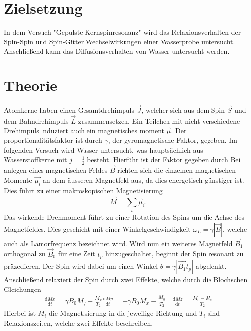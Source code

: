 \section{Zielsetzung}
In dem Versuch "Gepulste Kernspinresonanz" wird das Relaxionsverhalten der Spin-Spin und Spin-Gitter Wechselwirkungen einer Wasserprobe untersucht.
Anschließend kann das Diffusionsverhalten von Wasser untersucht werden.
\section{Theorie}
Atomkerne haben einen Gesamtdrehimpuls $\vec{J}$, welcher sich aus dem Spin $\vec{S}$ und dem Bahndrehimpuls $\vec{L}$ zusammensetzen.
Ein Teilchen mit nicht verschiedene Drehimpuls induziert auch ein magnetisches moment $\vec{\mu}$. Der proportionalitätsfaktor ist durch $\gamma$, der gyromagnetische Faktor, gegeben.
Im folgenden Versuch wird Wasser untersucht, was hauptsächlich aus Wasserstoffkerne mit $ j = \frac{1}{2}$ besteht.
Hierführ ist der Faktor \cite{} gegeben durch 
Bei anlegen eines magnetischen Feldes $\vec{B}$ richten sich die einzelnen magnetischen Momente $\vec{\mu_i}$ an dem äusseren Magnetfeld aus, da dies energetisch günstiger ist.
Dies führt zu einer makroskopischen Magnetisierung 
\begin{equation*}
    \vec{M} = \sum_i \vec{\mu}_i.
\end{equation*}
Das wirkende Drehmoment führt zu einer Rotation des Spins um die Achse des Magnetfeldes. Dies geschieht mit einer Winkelgeschwindigkeit $\omega_L = \gamma |\vec{B}|$, welche auch als Lamorfrequenz bezeichnet wird.
Wird nun ein weiteres Magnetfeld $\vec{B}_1 $ orthogonal zu $\vec{B}_0$ für eine Zeit $t_p$ hinzugeschaltet, beginnt der Spin resonant zu präzedieren. 
Der Spin wird dabei um einen Winkel $\theta = \gamma |\vec{B_1} t_p|$ abgelenkt. Anschließend relaxiert der Spin durch zwei Effekte, welche durch die Blochschen Gleichungen 
\begin{align}
    \frac{\mathrm{d}Mx}{\mathrm{d}t} = \gamma B_0 M_y - \frac{M_x}{T_2}      \frac{\mathrm{d}My}{\mathrm{d}t} = -\gamma B_0 M_x - \frac{M_y}{T_2}  \quad     \frac{\mathrm{d}Mz}{\mathrm{d}t} =  \frac{M_0 - M_z}{T_2} 
\end{align}  
Hierbei ist $M_i $ die Magnetisierung in die jeweilige Richtung und $T_i$ sind Relaxionszeiten, welche zwei Effekte beschreiben.
